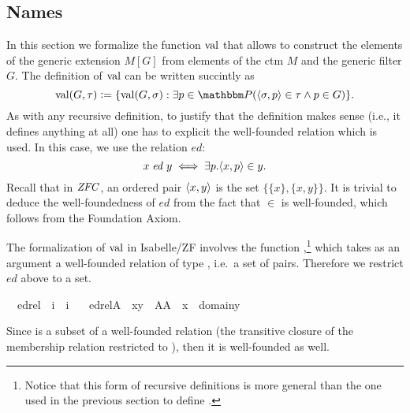 \subsection{Names}
\label{sec:names}
In this section we formalize the function $\operatorname{val}$ that allows to
construct the elements of the generic extension $M[G]$ from elements
of the ctm $M$ and the generic filter $G$. The definition of $\operatorname{val}$
can be written succintly as
%
\begin{equation}\label{eq:def-val}
\val(G,\tau)\defi \{\val(G,\sigma) : \exists p\in \PP
(\lb\sigma,p\rb\in\tau \y p\in G)\}.
\end{equation}
%
As with any recursive definition, to justify that the definition makes
sense (i.e., it defines anything at all) one has to explicit the
well-founded relation which is used. In this case, we use the relation
$\mathit{ed}$:
\[
x \mathrel{\mathit{ed}} y \iff \exists p . \langle x,p\rangle\in y.
\]
Recall that in $\mathit{ZFC}$, an ordered pair $\langle x,y \rangle$ is the set
$\{\{x\},\{x,y\}\}$. It is trivial to deduce the well-foundedness of
$\mathit{ed}$ from the fact that $\in$ is well-founded, which follows
from the Foundation Axiom.

The formalization of $\operatorname{val}$ in Isabelle/ZF involves the function
,\footnote{Notice that this form of recursive
  definitions is more general than the one used in the previous
  section to define .} which takes as an argument a
well-founded relation of type , i.e.\ a set of pairs. Therefore
we restrict $\mathit{ed}$ above to a set.
%
\begin{isabelle}
\isamarkupfalse%
\isanewline
\ \ edrel\ {\isacharcolon}{\isacharcolon}\ {\isachardoublequoteopen}i\ {\isasymRightarrow}\ i{\isachardoublequoteclose}\ \isanewline
\ \ {\isachardoublequoteopen}edrel{\isacharparenleft}A{\isacharparenright}\ {\isacharequal}{\isacharequal}\ {\isacharbraceleft}{\isacharless}x{\isacharcomma}y{\isachargreater}\ {\isasymin}\ A{\isacharasterisk}A\ {\isachardot}\ x\ {\isasymin}\ domain{\isacharparenleft}y{\isacharparenright}{\isacharbraceright}{\isachardoublequoteclose}
\end{isabelle}
%
Since  is a subset of a  well-founded relation (the
transitive closure of the membership relation restricted to ),
then it is well-founded as well.

